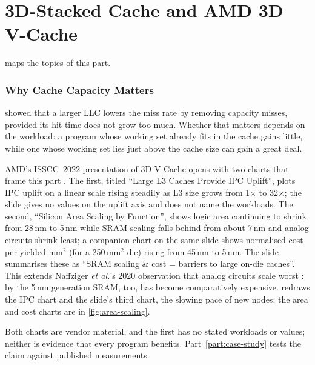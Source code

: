 \clearpage
\part{3D-Stacked Cache and AMD 3D V-Cache}
\label{part:stacked-cache}
 maps the topics of this part.



\section{Why Cache Capacity Matters}
\label{sec:why-cache-capacity}

 showed that a larger LLC lowers the miss rate by removing capacity misses, provided its hit time does not grow too much. Whether that matters depends on the workload: a program whose working set already fits in the cache gains little, while one whose working set lies just above the cache size can gain a great deal.

AMD's ISSCC~2022 presentation of 3D V-Cache opens with two charts that frame this part \cite[slides~5--6]{wuu2022vcache}. The first, titled ``Large L3 Caches Provide IPC Uplift'', plots IPC uplift on a linear scale rising steadily as L3 size grows from 1$\times$ to 32$\times$; the slide gives no values on the uplift axis and does not name the workloads. The second, ``Silicon Area Scaling by Function'', shows logic area continuing to shrink from 28\,nm to 5\,nm while SRAM scaling falls behind from about 7\,nm and analog circuits shrink least; a companion chart on the same slide shows normalised cost per yielded mm$^2$ (for a 250\,mm$^2$ die) rising from 45\,nm to 5\,nm. The slide summarises these as ``SRAM scaling \& cost = barriers to large on-die caches''. This extends Naffziger \emph{et al.}'s 2020 observation that analog circuits scale worst \cite{naffziger2020chiplet}: by the 5\,nm generation SRAM, too, has become comparatively expensive.  redraws the IPC chart and the slide's third chart, the slowing pace of new nodes; the area and cost charts are in \cref{fig:area-scaling}.



Both charts are vendor material, and the first has no stated workloads or values; neither is evidence that every program benefits. Part~\ref{part:case-study} tests the claim against published measurements.

